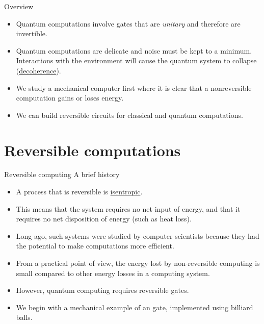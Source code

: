 
\begin{frame}{Overview}
\begin{itemize}
    \item Quantum computations involve gates that are \emph{unitary} and therefore are invertible.
    \item Quantum computations are delicate and noise must be kept to a minimum.  Interactions with the environment will cause the quantum system to collapse (\href{https://en.wikipedia.org/wiki/Quantum_decoherence}{decoherence}).
    \item We study a mechanical computer first where it is clear that a nonreversible computation gains or loses energy.
    \item We can build reversible circuits for classical and quantum computations.
    
\end{itemize}
\end{frame}

\section*{Reversible computations}

\begin{frame}{Reversible computing }{A brief history}
\begin{itemize}[<+->]
    \item A process that is reversible is \href{https://en.wikipedia.org/wiki/Isentropic_process}{isentropic}.
    \item This means that the system requires no net input of energy, and that it requires no net disposition of energy (such as heat loss).
    \item Long ago, such systems were studied by computer scientists because they had the potential to make computations more efficient.
    \item From a practical point of view, the energy lost by non-reversible computing is small compared to other energy losses in a computing system.
    \item However, quantum computing requires reversible gates.
    \item We begin with a mechanical example of an  gate, implemented using billiard balls.
\end{itemize}
\end{frame}


